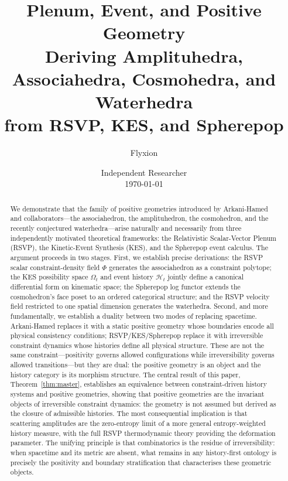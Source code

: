 \documentclass[11pt]{article}
\title{\textbf{Plenum, Event, and Positive Geometry}\\[0.6em]
\large Deriving Amplituhedra, Associahedra, Cosmohedra, and Waterhedra\\
from RSVP, KES, and Spherepop}
\author{Flyxion}
\date{Independent Researcher\\[0.4em] \today}
\theoremstyle{plain}
\theoremstyle{definition}
\theoremstyle{remark}
\newcommand{\Phif}{\Phi}
\newcommand{\OmKS}{\Omega}
\newcommand{\HKS}{\mathcal{H}}
\begin{document}
\maketitle
\makeatletter
\def\@oddhead{}
\def\@evenhead{}
\makeatother
\pagestyle{plain}
\thispagestyle{plain}

\begin{abstract}
We demonstrate that the family of positive geometries introduced by Arkani-Hamed and collaborators---the associahedron, the amplituhedron, the cosmohedron, and the recently conjectured waterhedra---arise naturally and necessarily from three independently motivated theoretical frameworks: the Relativistic Scalar-Vector Plenum (RSVP), the Kinetic-Event Synthesis (KES), and the Spherepop event calculus. The argument proceeds in two stages. First, we establish precise derivations: the RSVP scalar constraint-density field $\Phif$ generates the associahedron as a constraint polytope; the KES possibility space $\OmKS_t$ and event history $\HKS_t$ jointly define a canonical differential form on kinematic space; the Spherepop log functor extends the cosmohedron's face poset to an ordered categorical structure; and the RSVP velocity field restricted to one spatial dimension generates the waterhedra. Second, and more fundamentally, we establish a duality between two modes of replacing spacetime. Arkani-Hamed replaces it with a static positive geometry whose boundaries encode all physical consistency conditions; RSVP/KES/Spherepop replace it with irreversible constraint dynamics whose histories define all physical structure. These are not the same constraint---positivity governs allowed configurations while irreversibility governs allowed transitions---but they are dual: the positive geometry is an object and the history category is its morphism structure. The central result of this paper, Theorem~\ref{thm:master}, establishes an equivalence between constraint-driven history systems and positive geometries, showing that positive geometries are the invariant objects of irreversible constraint dynamics: the geometry is not assumed but derived as the closure of admissible histories. The most consequential implication is that scattering amplitudes are the zero-entropy limit of a more general entropy-weighted history measure, with the full RSVP thermodynamic theory providing the deformation parameter. The unifying principle is that combinatorics is the residue of irreversibility: when spacetime and its metric are absent, what remains in any history-first ontology is precisely the positivity and boundary stratification that characterises these geometric objects.
\end{abstract}
\end{document}
